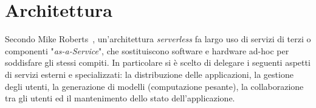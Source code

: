 \section{Architettura}
\label{sec:chapter_2_section_5}

Secondo Mike Roberts~\cite{Roberts}, un'architettura \emph{serverless} fa largo uso di servizi di terzi
o componenti "\emph{as-a-Service}", che sostituiscono software e hardware ad-hoc per soddisfare gli stessi compiti.
In particolare si è scelto di delegare i seguenti aspetti di servizi esterni e specializzati:
la distribuzione delle applicazioni, la gestione degli utenti, la generazione di modelli (computazione pesante),
la collaborazione tra gli utenti ed il mantenimento dello stato dell'applicazione.\\
